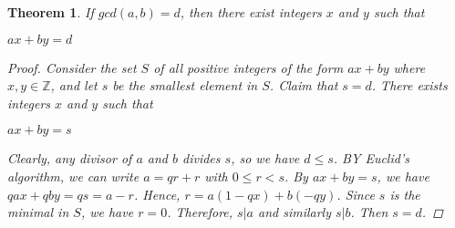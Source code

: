 \documentclass[psamsfonts]{amsart}
\newtheorem{thm}{Theorem}[section]
\theoremstyle{definition}
\theoremstyle{remark}
\numberwithin{equation}{section}
\begin{document}
			\begin{thm}
				If $gcd(a,b) = d$, then there exist integers $x$ and $y$ such that\\
				\begin{center}
					$ax + by = d$
				\end{center}								
				\vspace{2mm}
				
				\begin{proof}
					Consider the set $S$ of all positive integers of the form $ax+by$ where $x,y \in \mathbb{Z}$, and let $s$ be the smallest element in $S$. Claim that $s = d$. There exists integers $x$ and $y$ such that\\
					\begin{center}
						$ax+by = s$
					\end{center}
					\vspace{2mm}
					
					Clearly, any divisor of $a$ and $b$ divides $s$, so we have $d \leq s$. BY Euclid's algorithm, we can write $a = qr + r$ with $0 \leq r < s$. By $ax+by = s$, we have $qax + qby = qs = a - r$. Hence, $r = a(1-qx) + b(-qy)$. Since $s$ is the minimal in $S$, we have $r = 0$. Therefore, $s|a$ and similarly $s|b$. Then $s = d$.
				\end{proof}
			\end{thm}
\end{document}
